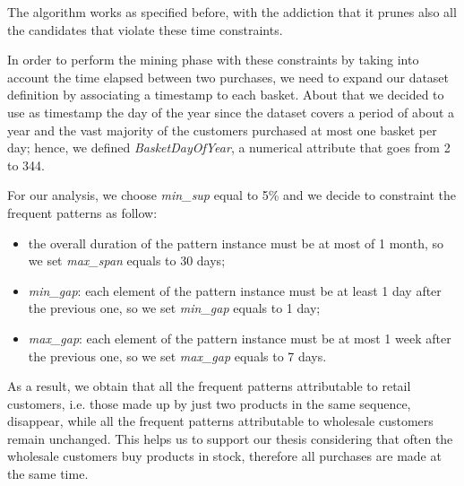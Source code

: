 The algorithm works as specified before, with the addiction that it prunes also all the candidates that violate these time constraints.

In order to perform the mining phase with these constraints by taking into account the time elapsed between two purchases, we need to expand our dataset definition by associating a timestamp to each basket. About that we decided to use as timestamp the day of the year since the dataset covers a period of about a year and the vast majority of the customers purchased at most one basket per day; hence, we defined \emph{BasketDayOfYear}, a numerical attribute that goes from 2 to 344.

For our analysis, we choose \emph{min\_sup} equal to 5\% and we decide to constraint the frequent patterns as follow: 

\begin{itemize}
\item the overall duration of the pattern instance must be at most of 1 month, so we set \emph{max\_span} equals to 30 days;
\item \emph{min\_gap}: each element of the pattern instance must be at least 1 day after the previous one, so we set \emph{min\_gap} equals to 1 day;
\item \emph{max\_gap}: each element of the pattern instance must be at most 1 week after the previous one, so we set \emph{max\_gap} equals to 7 days.
\end{itemize}

As a result, we obtain that all the frequent patterns attributable to retail customers, i.e. those made up by just two products in the same sequence, disappear, while all the frequent patterns attributable to wholesale customers remain unchanged. This helps us to support our thesis considering that often the wholesale customers buy products in stock, therefore all purchases are made at the same time.
